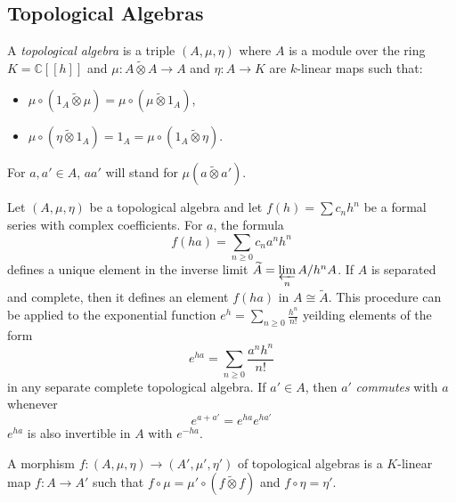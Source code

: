 \documentclass[8pt]{article}
\theoremstyle{definition}
\theoremstyle{definition}
\theoremstyle{definition}
\theoremstyle{definition}
\theoremstyle{definition}
\theoremstyle{definition}
\theoremstyle{definition}
\theoremstyle{definition}
\theoremstyle{definition}
\theoremstyle{definition}
\theoremstyle{definition}
\theoremstyle{definition}
\theoremstyle{definition}
\theoremstyle{definition}
\theoremstyle{question}
\newcommand{\tildetimes}[0]{\widetilde{\otimes}}
\begin{document}
\subsection{Topological Algebras}

A \emph{topological algebra} is a triple $(A, \mu, \eta)$ where $A$ is a module over the ring 
$K = \mathbb{C}[[h]]$ and $\mu : A \tildetimes A \to A$ and $\eta : A \to K$ are $k$-linear maps such that:
\begin{itemize}
  \item $\mu \circ (1_A \tildetimes \mu) = \mu \circ (\mu \tildetimes 1_A)$,
  \item $\mu \circ (\eta \tildetimes 1_A) = 1_A = \mu \circ (1_A \tildetimes \eta)$.
\end{itemize}
For $a, a' \in A$, $aa'$ will stand for $\mu(a \tildetimes a')$.

Let $(A, \mu, \eta)$ be a topological algebra and let $f(h) = \sum \limits c_n h^n$ be a formal series with 
complex coefficients. For $a$, the formula
\[
f(ha) = \sum \limits_{n \geq 0} c_n a^n h^n
\]
defines a unique element in the inverse limit $\widetilde{A} = \varprojlim \limits_{n} A/h^n A$. If 
$A$ is separated and complete, then it defines an element $f(ha)$ in $A \cong \widetilde{A}$. This procedure can
be applied to the exponential function $e^h = \sum \limits_{n \geq 0} \frac{h^n}{n!}$ yeilding elements of the form
\[
e^{ha} = \sum \limits_{n \geq 0} \frac{a^n h^n}{n!}
\]
in any separate complete topological algebra. If $a' \in A$, then $a'$ \emph{commutes} with $a$ whenever
\[
e^{a + a'} = e^{ha}e^{ha'}
\]
$e^{ha}$ is also invertible in $A$ with $e^{-ha}$.

A morphism $f : (A, \mu, \eta) \to (A', \mu', \eta')$ of topological algebras is a $K$-linear map 
$f : A \to A'$ such that $f \circ \mu = \mu' \circ (f \tildetimes f)$ and $f \circ \eta = \eta'$.
\end{document}
